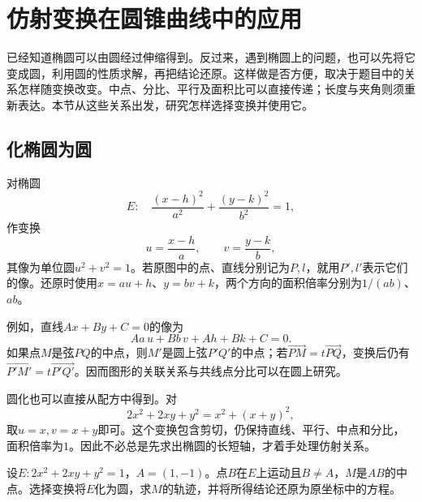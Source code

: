 \newpage
\section{仿射变换在圆锥曲线中的应用}
\label{sec:quadratic-affine-applications}

已经知道椭圆可以由圆经过伸缩得到。反过来，遇到椭圆上的问题，也可以先将它变成圆，利用圆的性质求解，再把结论还原。这样做是否方便，取决于题目中的关系怎样随变换改变。中点、分比、平行及面积比可以直接传递；长度与夹角则须重新表达。本节从这些关系出发，研究怎样选择变换并使用它。

\subsection{化椭圆为圆}
\label{subsec:quadratic-choosing-affine-transformations}

对椭圆
\begin{equation*}
    E:\quad \frac{(x-h)^2}{a^2}+\frac{(y-k)^2}{b^2}=1 ,
\end{equation*}
作变换
\begin{equation}\label{eq:quadratic-ellipse-normalization}
    u=\frac{x-h}{a} ,\qquad v=\frac{y-k}{b} ,
\end{equation}
其像为单位圆\(u^2+v^2=1\)。若原图中的点、直线分别记为\(P,l\)，就用\(P',l'\)表示它们的像。还原时使用\(x=au+h\)、\(y=bv+k\)，两个方向的面积倍率分别为\(1/(ab)\)、\(ab\)。

例如，直线\(Ax+By+C=0\)的像为
\begin{equation*}
    Aa\,u+Bb\,v+Ah+Bk+C=0 .
\end{equation*}
如果点\(M\)是弦\(PQ\)的中点，则\(M'\)是圆上弦\(P'Q'\)的中点；若\(\overrightarrow{PM}=t\overrightarrow{PQ}\)，变换后仍有\(\overrightarrow{P'M'}=t\overrightarrow{P'Q'}\)。因而图形的关联关系与共线点分比可以在圆上研究。

圆化也可以直接从配方中得到。对
\begin{equation*}
    2x^2+2xy+y^2=x^2+(x+y)^2 ,
\end{equation*}
取\(u=x,v=x+y\)即可。这个变换包含剪切，仍保持直线、平行、中点和分比，面积倍率为\(1\)。因此不必总是先求出椭圆的长短轴，才着手处理仿射关系。

\begin{samepage}
\begin{example}\label{ex:quadratic-shear-midpoint-locus}
设\(E:2x^2+2xy+y^2=1\)，\(A=(1,-1)\)。点\(B\)在\(E\)上运动且\(B\ne A\)，\(M\)是\(AB\)的中点。选择变换将\(E\)化为圆，求\(M\)的轨迹，并将所得结论还原为原坐标中的方程。
\end{example}
\end{samepage}

